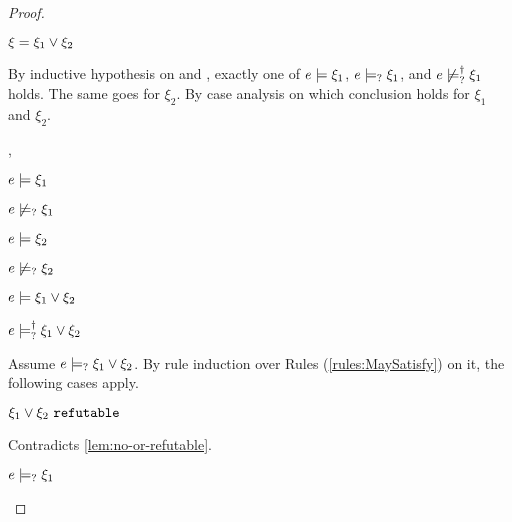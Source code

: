 \begin{proof}
\begin{byCases}
\item[\text{(\ref{rule:CTOr})}]
    \begin{pfsteps*}
    \item $\xi=\xi_1 \vee \xi_2$ 
    \end{pfsteps*}
    By inductive hypothesis on  and , exactly one of $e \models \xi_1$, $e \models_{?} \xi_1$, and $e \not\models_{?}^{\dag} \xi_1$ holds. The same goes for $\xi_2$. By case analysis on which conclusion holds for $\xi_1$ and $\xi_2$.
    \begin{byCases}
    \item[\csatisfy{e}{\xi_1},\csatisfy{e}{\xi_2}]
        \begin{pfsteps*}
        \item $e \models \xi_1$  
        \item $e \not\models_{?} \xi_1$  
        \item $e \models \xi_2$  
        \item $e \not\models_{?} \xi_2$  
        \item $e \models \xi_1 \vee \xi_2$  
        \item $e \models_{?}^{\dag} \xi_1 \vee \xi_2$ 
        \end{pfsteps*}
        Assume $e \models_{?} \xi_1 \vee \xi_2$. By rule induction over Rules (\ref{rules:MaySatisfy}) on it, the following cases apply.
        \begin{byCases}
        \item[\text{(\ref{rule:CMSNotVal})}]
            \begin{pfsteps*}
            \item $\xi_1 \vee \xi_2 ~\mathtt{refutable}$ 
            \end{pfsteps*}
            Contradicts \autoref{lem:no-or-refutable}.
        \item[\text{(\ref{rule:CMSOr1})}]
            \begin{pfsteps*}
            \item $e \models_{?} \xi_1$ 
            \end{pfsteps*}

\end{byCases}
\end{byCases}
\end{byCases}
\end{proof}
